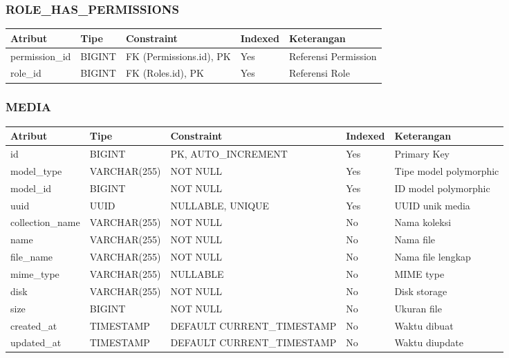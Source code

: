 \documentclass[12pt,a4paper]{article}
\begin{document}
\subsubsection{ROLE\_HAS\_PERMISSIONS}
\begin{tabularx}{\textwidth}{|l|l|l|l|X|}
\hline
\textbf{Atribut} & \textbf{Tipe} & \textbf{Constraint} & \textbf{Indexed} & \textbf{Keterangan} \\
\hline
permission\_id & BIGINT & FK (Permissions.id), PK & Yes & Referensi Permission \\
\hline
role\_id & BIGINT & FK (Roles.id), PK & Yes & Referensi Role \\
\hline
\end{tabularx}

\subsubsection{MEDIA}
\begin{tabularx}{\textwidth}{|l|l|l|l|X|}
\hline
\textbf{Atribut} & \textbf{Tipe} & \textbf{Constraint} & \textbf{Indexed} & \textbf{Keterangan} \\
\hline
id & BIGINT & PK, AUTO\_INCREMENT & Yes & Primary Key \\
\hline
model\_type & VARCHAR(255) & NOT NULL & Yes & Tipe model polymorphic \\
\hline
model\_id & BIGINT & NOT NULL & Yes & ID model polymorphic \\
\hline
uuid & UUID & NULLABLE, UNIQUE & Yes & UUID unik media \\
\hline
collection\_name & VARCHAR(255) & NOT NULL & No & Nama koleksi \\
\hline
name & VARCHAR(255) & NOT NULL & No & Nama file \\
\hline
file\_name & VARCHAR(255) & NOT NULL & No & Nama file lengkap \\
\hline
mime\_type & VARCHAR(255) & NULLABLE & No & MIME type \\
\hline
disk & VARCHAR(255) & NOT NULL & No & Disk storage \\
\hline
size & BIGINT & NOT NULL & No & Ukuran file \\
\hline
created\_at & TIMESTAMP & DEFAULT CURRENT\_TIMESTAMP & No & Waktu dibuat \\
\hline
updated\_at & TIMESTAMP & DEFAULT CURRENT\_TIMESTAMP & No & Waktu diupdate \\
\hline
\end{tabularx}
\end{document}
